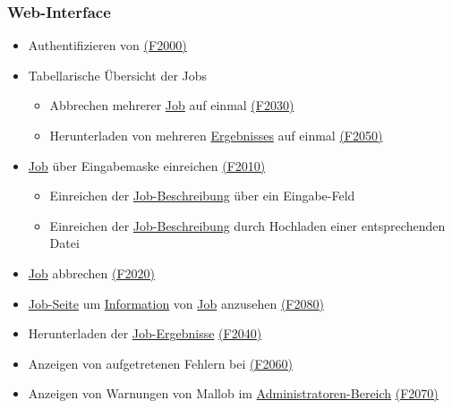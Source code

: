     \subsubsection{Web-Interface}
        \begin{itemize}[noitemsep]
            \item Authentifizieren von  \hyperref[FA:Web-Interface:Anmelden]{(F2000)}
            \item Tabellarische Übersicht  der Jobs
                \begin{itemize}[noitemsep]
                    \item Abbrechen mehrerer \hyperref[B:Jobs]{Job} auf einmal \hyperref[FA:Web-Interface:Abbruch mehrerer Jobs auf einmal]{(F2030)}
                    \item Herunterladen von mehreren \hyperref[B:Job-Ergebnis]{Ergebnisses} auf einmal \hyperref[FA:Web-Interface:herunterladen mehrerer Ergebnisse auf einmal]{(F2050)}
                \end{itemize}
            \item \hyperref[B:Jobs]{Job} über Eingabemaske einreichen \hyperref[FA:Web-Interface:Job einreichen]{(F2010)}
                \begin{itemize}[noitemsep]
                    \item Einreichen der \hyperref[B:Job-Beschreibung]{Job-Beschreibung} über ein Eingabe-Feld 
                    \item Einreichen der \hyperref[B:Job-Beschreibung]{Job-Beschreibung} durch Hochladen einer entsprechenden Datei
                \end{itemize}
            \item \hyperref[B:Jobs]{Job} abbrechen \hyperref[FA:Web-Interface:Abbruch eines einzelnen Jobs]{(F2020)}
            \item \hyperref[pages:job-page]{Job-Seite} um \hyperref[B:Job-Informationen]{Information} von \hyperref[B:Jobs]{Job} anzusehen \hyperref[FA:Web-Interface:Einsehen von Job-Informationen]{(F2080)}
            \item Herunterladen der \hyperref[B:Job-Ergebnis]{Job-Ergebnisse} \hyperref[FA:Web-Interface:Herunterladen eines einzelnen Ergebnisses]{(F2040)}
            \item Anzeigen von aufgetretenen Fehlern bei  \hyperref[FA:Web-Interface:Anzeigen von Fehlern]{(F2060)}
            \item Anzeigen von Warnungen von \gls{Mallob} im \hyperref[pages:admin]{Administratoren-Bereich} \hyperref[FA:Web-Interface:Anzeigen von Warnungen und Fehlermeldungen]{(F2070)} 
            
                      
        \end{itemize}
